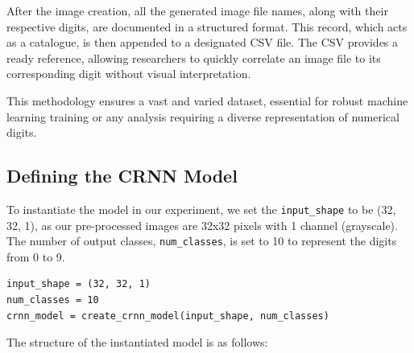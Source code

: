 After the image creation, all the generated image file names, along with their respective digits, are documented in a structured format. This record, which acts as a catalogue, is then appended to a designated CSV file. The CSV provides a ready reference, allowing researchers to quickly correlate an image file to its corresponding digit without visual interpretation.

This methodology ensures a vast and varied dataset, essential for robust machine learning training or any analysis requiring a diverse representation of numerical digits.


\subsection{Defining the CRNN Model}

To instantiate the model in our experiment, we set the \texttt{input\_shape} to be (32, 32, 1), as our pre-processed images are 32x32 pixels with 1 channel (grayscale). The number of output classes, \texttt{num\_classes}, is set to 10 to represent the digits from 0 to 9.

\begin{verbatim}
input_shape = (32, 32, 1)
num_classes = 10
crnn_model = create_crnn_model(input_shape, num_classes)
\end{verbatim}

The structure of the instantiated model is as follows:

